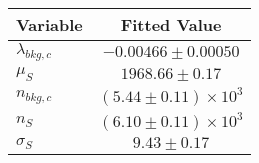 \begin{tabular}[t]{lc}
\hline
Variable &Fitted Value\\
\hline\hline
$\lambda_{bkg,c}$&$-0.00466\pm0.00050$\\
\hline
$\mu_{S}$&$1968.66\pm0.17$\\
\hline
$n_{bkg,c}$&$(5.44\pm0.11)\times 10^3$\\
\hline
$n_{S}$&$(6.10\pm0.11)\times 10^3$\\
\hline
$\sigma_{S}$&$9.43\pm0.17$\\
\hline
\end{tabular}